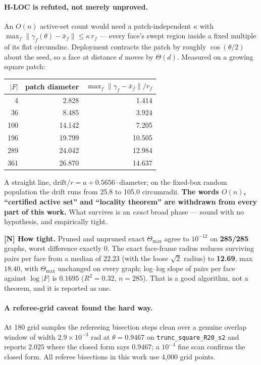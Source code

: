 \documentclass[11pt,a4paper]{article}
\theoremstyle{definition}
\newcommand{\Tmax}{\Theta_{\max}}
\newcommand{\file}[1]{\texttt{\small #1}}
\begin{document}
\paragraph{H-LOC is refuted, not merely unproved.} An $O(n)$ active-set count would need a
patch-independent $\kappa$ with $\max_f\|\gamma_f(\theta)-\bar{x}_f\|\le\kappa\,r_f$ ---
every face's swept region inside a fixed multiple of its flat circumdisc. Deployment
contracts the patch by roughly $\cos(\theta/2)$ about the seed, so a face at distance $d$
moves by $\Theta(d)$. Measured on a growing square patch:

\begin{center}
\small
\begin{tabular}{@{}rrr@{}}
\toprule
$|F|$ & patch diameter & $\max_f\|\gamma_f-\bar{x}_f\|/r_f$ \\
\midrule
4 & 2.828 & 1.414\\
36 & 8.485 & 3.924\\
100 & 14.142 & 7.205\\
196 & 19.799 & 10.505\\
289 & 24.042 & 12.984\\
361 & 26.870 & 14.637\\
\bottomrule
\end{tabular}
\end{center}

\noindent A straight line, $\mathrm{drift}/r = a + 0.5656\cdot\mathrm{diameter}$; on the
fixed-box random population the drift runs from 25.8 to 105.0 circumradii. \textbf{The words
$O(n)$, ``certified active set'' and ``locality theorem'' are withdrawn from every part of
this work.} What survives is an \emph{exact} broad phase --- sound with no hypothesis, and
empirically tight.

\textbf{[N] How tight.} Pruned and unpruned exact $\Tmax$ agree to $10^{-12}$ on
\textbf{285/285} graphs, worst difference exactly $0$. The exact face-frame radius reduces
surviving pairs per face from a median of $22.23$ (with the loose $\sqrt2$ radius) to
\textbf{12.69}, max $18.40$, with $\Tmax$ unchanged on every graph; log--log slope of pairs
per face against $\log|F|$ is $0.1695$ ($R^2=0.32$, $n=285$). That is a good algorithm, not a
theorem, and it is reported as one.

\paragraph{A referee-grid caveat found the hard way.} At 180 grid samples the refereeing
bisection steps clean over a genuine overlap window of width $2.9\times10^{-3}$ rad at
$\theta=0.9467$ on \file{trunc\_square\_R20\_s2} and reports $2.025$ where the closed form
says $0.9467$; a $10^{-4}$ fine scan confirms the closed form. All referee bisections in this
work use 4{,}000 grid points.
\end{document}
